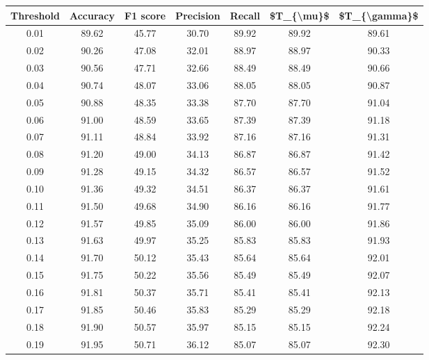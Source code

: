\begin{tabular}{|c|c|c|c|c|c|c|}
\hline
 Threshold &  Accuracy &  F1 score &  Precision &  Recall &  \$T\_\{\textbackslash mu\}\$ &  \$T\_\{\textbackslash gamma\}\$ \\
\hline
      0.01 &     89.62 &     45.77 &      30.70 &   89.92 &      89.92 &         89.61 \\
      0.02 &     90.26 &     47.08 &      32.01 &   88.97 &      88.97 &         90.33 \\
      0.03 &     90.56 &     47.71 &      32.66 &   88.49 &      88.49 &         90.66 \\
      0.04 &     90.74 &     48.07 &      33.06 &   88.05 &      88.05 &         90.87 \\
      0.05 &     90.88 &     48.35 &      33.38 &   87.70 &      87.70 &         91.04 \\
      0.06 &     91.00 &     48.59 &      33.65 &   87.39 &      87.39 &         91.18 \\
      0.07 &     91.11 &     48.84 &      33.92 &   87.16 &      87.16 &         91.31 \\
      0.08 &     91.20 &     49.00 &      34.13 &   86.87 &      86.87 &         91.42 \\
      0.09 &     91.28 &     49.15 &      34.32 &   86.57 &      86.57 &         91.52 \\
      0.10 &     91.36 &     49.32 &      34.51 &   86.37 &      86.37 &         91.61 \\
      0.11 &     91.50 &     49.68 &      34.90 &   86.16 &      86.16 &         91.77 \\
      0.12 &     91.57 &     49.85 &      35.09 &   86.00 &      86.00 &         91.86 \\
      0.13 &     91.63 &     49.97 &      35.25 &   85.83 &      85.83 &         91.93 \\
      0.14 &     91.70 &     50.12 &      35.43 &   85.64 &      85.64 &         92.01 \\
      0.15 &     91.75 &     50.22 &      35.56 &   85.49 &      85.49 &         92.07 \\
      0.16 &     91.81 &     50.37 &      35.71 &   85.41 &      85.41 &         92.13 \\
      0.17 &     91.85 &     50.46 &      35.83 &   85.29 &      85.29 &         92.18 \\
      0.18 &     91.90 &     50.57 &      35.97 &   85.15 &      85.15 &         92.24 \\
      0.19 &     91.95 &     50.71 &      36.12 &   85.07 &      85.07 &         92.30 \\

\end{tabular}
